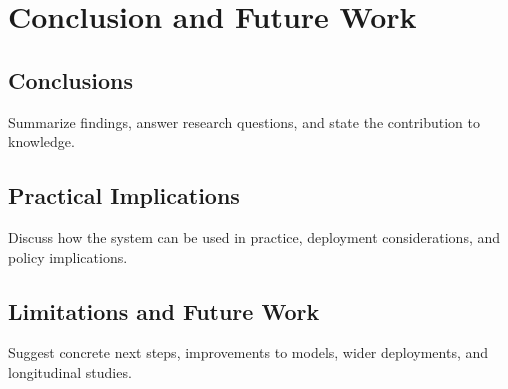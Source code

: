 \chapter{Conclusion and Future Work}
\label{ch:conclusion}

\section{Conclusions}
\noindent Summarize findings, answer research questions, and state the contribution to knowledge.

\section{Practical Implications}
\noindent Discuss how the system can be used in practice, deployment considerations, and policy implications.

\section{Limitations and Future Work}
\noindent Suggest concrete next steps, improvements to models, wider deployments, and longitudinal studies.
